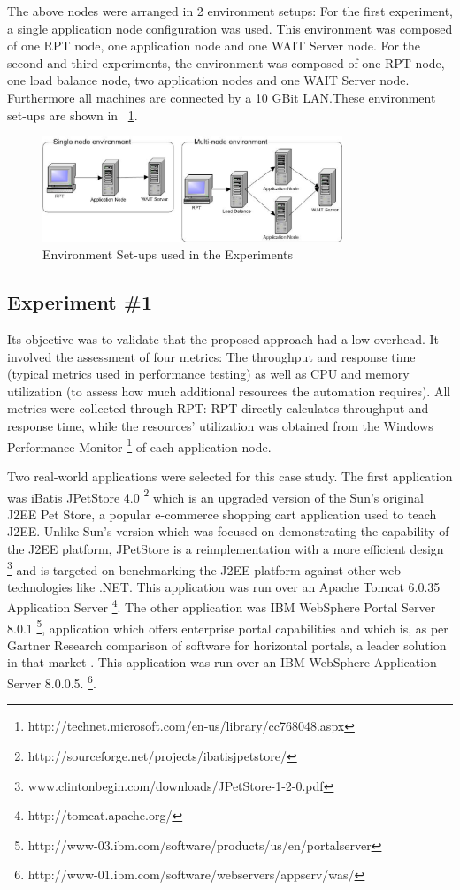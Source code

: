 \documentclass[runningheads,a4paper]{llncs}
\begin{document}
The above nodes were arranged in 2 environment setups: For the first
experiment, a single application node configuration was used. This environment was composed of one RPT node, 
one application node and one WAIT Server node. For the second and
third experiments, the environment was composed of one RPT node, one load
balance node, two application nodes and one WAIT Server node. Furthermore all
machines are connected by a 10 GBit LAN.These environment set-ups are shown in \figurename ~\ref{fig_env}.

\begin{figure}[!h]
\centering
\includegraphics[totalheight=.25\textheight,width=0.8\textwidth]{Environments}
\caption{Environment Set-ups used in the Experiments}
\label{fig_env}
\end{figure}

\subsection{Experiment \#1}

Its objective was to validate that the proposed approach had a low overhead.
It involved the assessment of four metrics: The throughput and response time
(typical metrics used in performance testing) as well as CPU and memory utilization (to assess how much additional resources the automation
requires). All metrics were collected through RPT: RPT directly
calculates throughput and response time, while the resources' utilization was
obtained from the Windows Performance Monitor \footnote{http://technet.microsoft.com/en-us/library/cc768048.aspx} of each application node.

Two real-world applications were selected for this case study. The first
application was iBatis JPetStore 4.0
\footnote{http://sourceforge.net/projects/ibatisjpetstore/} which is an 
upgraded version of the Sun's original J2EE Pet Store, a popular e-commerce
shopping cart application used to teach J2EE. Unlike Sun’s version which was 
focused on demonstrating the capability of the J2EE platform, JPetStore is a
reimplementation with a more efficient design \footnote{www.clintonbegin.com/downloads/JPetStore-1-2-0.pdf‎} and is 
targeted on benchmarking the J2EE platform against other web technologies
like .NET. This application was run over an Apache
Tomcat 6.0.35 Application Server \footnote{http://tomcat.apache.org/}. The
other application was IBM WebSphere Portal Server 8.0.1
\footnote{http://www-03.ibm.com/software/products/us/en/portalserver},
application which offers enterprise portal capabilities and which is, as per
Gartner Research comparison of software for horizontal portals, a leader solution in that market \cite{Gartner2008}. 
This application was run over an IBM WebSphere Application Server 8.0.0.5.
\footnote{http://www-01.ibm.com/software/webservers/appserv/was/}.
\end{document}

